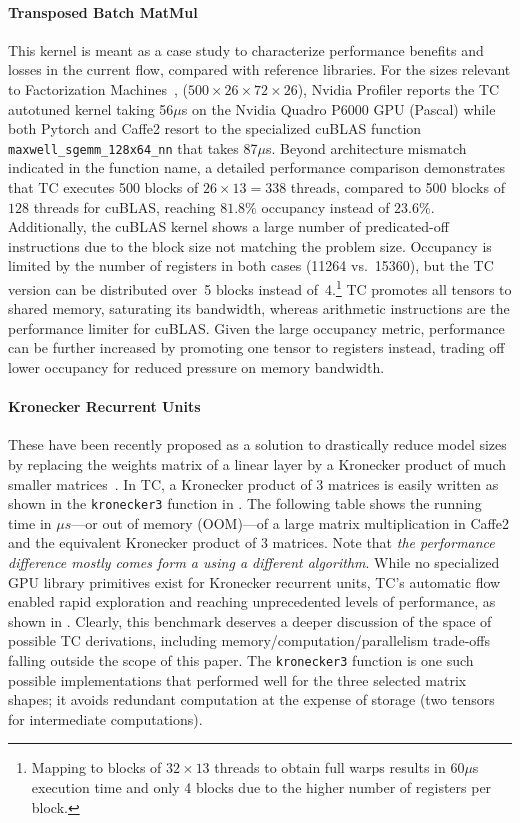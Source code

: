 \paragraph{Transposed Batch MatMul}
This kernel is meant as a case study to characterize performance benefits and losses in the current flow, compared with reference libraries.
For the sizes relevant to Factorization Machines~\cite{Rendle2010}, ($500
\times 26 \times 72 \times 26$), Nvidia Profiler reports
the TC autotuned
kernel taking 56$\mu$s on the Nvidia Quadro P6000 GPU (Pascal) while both Pytorch and Caffe2 resort to the specialized cuBLAS function
\texttt{maxwell\_sgemm\_128x64\_nn} that takes 87$\mu$s.
Beyond architecture mismatch indicated in the function name, a detailed
performance comparison demonstrates that TC executes 500 blocks of $26
\times 13 = 338$ threads, compared to 500 blocks of $128$ threads for cuBLAS,
reaching $81.8\%$ occupancy instead of $23.6\%$.
Additionally,
the cuBLAS kernel shows a large number of predicated-off instructions
due to the block size not matching the problem size.
Occupancy is limited by the number of registers in both
cases (11264 vs.\ 15360), but the TC version can be distributed over~5 blocks instead of~4.\footnote{Mapping to blocks of $32 \times 13$ threads to obtain full warps
results in 60$\mu$s execution time and only 4 blocks due to the higher number of
registers per block.}
TC promotes all tensors to shared memory, saturating its bandwidth, whereas arithmetic instructions are the performance limiter for cuBLAS.
Given the large occupancy metric, performance can be further increased by promoting one tensor to
registers instead, trading off lower occupancy for reduced pressure on memory bandwidth.

\paragraph{Kronecker Recurrent Units}
These have been recently proposed as a solution to drastically reduce
model sizes by replacing the weights matrix of a linear layer by a
Kronecker product of much smaller matrices~\cite{KRU17}.  In TC, a
Kronecker product of 3 matrices is easily written as shown in the
\texttt{kronecker3} function in .
The following table shows
the running time in $\mu s$---or out of memory (OOM)---of a large
matrix multiplication in Caffe2 and the equivalent Kronecker product
of 3 matrices.  Note that \emph{the performance difference mostly
  comes form a using a different algorithm}.  While no specialized GPU
library primitives exist for Kronecker recurrent units, TC's automatic
flow enabled rapid exploration and reaching unprecedented levels of
performance, as shown in .
Clearly, this benchmark deserves a deeper discussion of the space of
possible TC derivations, including memory/computation/parallelism trade-offs
falling outside the scope of this paper.
The \texttt{kronecker3} function is one such possible implementations that
performed well for the three selected matrix shapes;
it avoids redundant computation at the expense of storage
(two tensors for intermediate computations).

